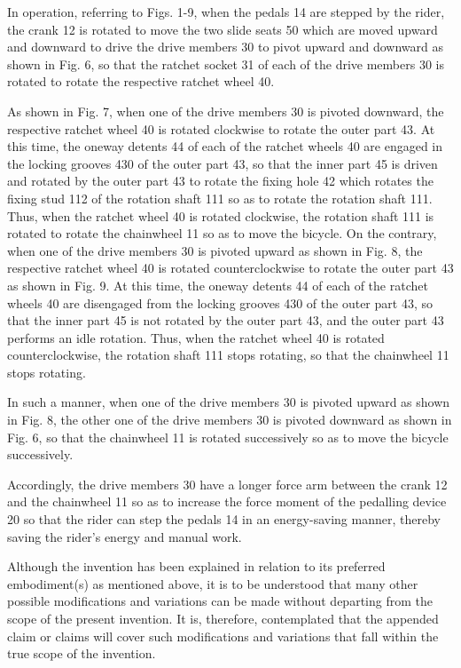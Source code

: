 \documentclass[10pt, a4paper]{article}
\begin{document}
{{			In operation, referring to Figs. 1-9, when the pedals 14 are stepped by the rider, the crank 12 is rotated to move the two slide seats 50 which are moved upward and downward to
			drive the drive members 30 to pivot upward and downward as shown in Fig. 6, so that the
			ratchet socket 31 of each of the drive members 30 is rotated to rotate the respective
			ratchet wheel 40. \newline
			
			As shown in Fig. 7, when one of the drive members 30 is pivoted downward, the
			respective ratchet wheel 40 is rotated clockwise to rotate the outer part 43. At this time, the oneway detents 44 of each of the ratchet wheels 40 are engaged in the locking grooves 430 of the outer part 43, so that the inner part 45 is driven and rotated by the outer part 43 to rotate the fixing hole 42 which rotates the fixing stud 112 of the rotation shaft 111 so as to rotate the rotation shaft 111. Thus, when the ratchet wheel 40 is rotated clockwise, the rotation shaft 111 is rotated to rotate the chainwheel 11 so as to move the bicycle. On the contrary, when one of the drive members 30 is pivoted upward as shown in Fig. 8, the respective ratchet wheel 40 is rotated counterclockwise to rotate the outer part 43 as shown in Fig. 9. At this time, the oneway detents 44 of each of the ratchet wheels 40 are disengaged from the locking grooves 430 of the outer part 43, so that the inner part 45 is not rotated by the outer part 43, and the outer part 43 performs an idle rotation. Thus, when the ratchet wheel 40 is rotated counterclockwise, the rotation shaft 111 stops rotating, so that the chainwheel 11 stops rotating. \newline
			
			In such a manner, when one of the drive members 30 is pivoted upward as shown in Fig.
			8, the other one of the drive members 30 is pivoted downward as shown in Fig. 6, so that
			the chainwheel 11 is rotated successively so as to move the bicycle successively. \newline
			
			Accordingly, the drive members 30 have a longer force arm between the crank 12 and the
			chainwheel 11 so as to increase the force moment of the pedalling device 20 so that the
			rider can step the pedals 14 in an energy-saving manner, thereby saving the rider’s energy
			and manual work. \newline
			
			Although the invention has been explained in relation to its preferred embodiment(s) as
			mentioned above, it is to be understood that many other possible modifications and
			variations can be made without departing from the scope of the present invention. It is,
			therefore, contemplated that the appended claim or claims will cover such modifications
			and variations that fall within the true scope of the invention. 
		} \\
	}
	
\end{document}
